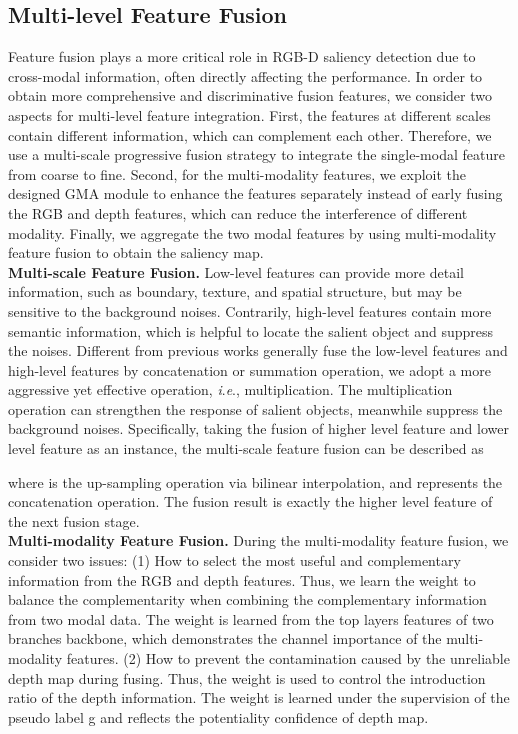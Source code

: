 \documentclass[journal]{IEEEtran}
\newcommand{\ie}{\textit{i}.\textit{e}.}
\begin{document}
\subsection{Multi-level Feature Fusion}
Feature fusion plays a more critical role in RGB-D saliency detection due to cross-modal information, often directly affecting the performance. In order to obtain more comprehensive and discriminative fusion features, we consider two aspects for multi-level feature integration. First, the features at different scales contain different information, which can complement each other. Therefore, we use a multi-scale progressive fusion strategy to integrate the single-modal feature from coarse to fine. Second, for the multi-modality features, we exploit the designed GMA module to enhance the features separately instead of early fusing the RGB and depth features, which can reduce the interference of different modality. Finally, we aggregate the two modal features by using multi-modality feature fusion to obtain the saliency map.\\
\indent \textbf{Multi-scale Feature Fusion.} Low-level features can provide more detail information, such as boundary, texture, and spatial structure, but may be sensitive to the background noises. Contrarily, high-level features contain more semantic information, which is helpful to locate the salient object and suppress the noises. Different from previous works \cite{Qin_2019_CVPR,Liu2019PoolSal} generally fuse the low-level features and high-level features  by concatenation or summation operation, we adopt a more aggressive yet effective operation, \ie, multiplication. The multiplication operation can strengthen the response of salient objects, meanwhile suppress the background noises. Specifically, taking the fusion of higher level feature  and lower level feature  as an instance, the multi-scale feature fusion can be described as

where  is the up-sampling operation via bilinear interpolation, and  represents the concatenation operation.
The fusion result  is exactly the higher level feature of the next fusion stage. \\
\indent\textbf{Multi-modality Feature Fusion.}
During the multi-modality feature fusion, we consider two issues:
(1) How to select the most useful and complementary information from the RGB and depth features. Thus, we learn the weight  to balance the complementarity when combining the complementary information from two modal data. The weight  is learned from the top layers features of two branches backbone, which demonstrates the channel importance of the multi-modality features.
(2) How to prevent the contamination caused by the unreliable depth map during fusing. Thus, the weight  is used to control the introduction ratio of the depth information. The weight  is learned under the supervision of the pseudo label g and reflects the potentiality confidence of depth map.
\end{document}
